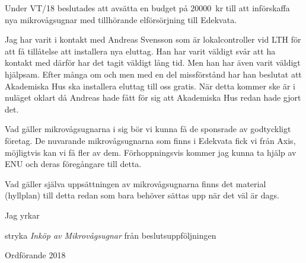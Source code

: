\documentclass[../_main/handlingar.tex]{subfiles}
\begin{document}
Under VT/18 beslutades att avsätta en budget på \SI{20 000}{kr} till att införskaffa nya mikrovågsugnar med tillhörande elförsörjning till Edekvata.

Jag har varit i kontakt med Andreas Svensson som är lokalcontroller vid LTH för att få tillåtelse att installera nya eluttag. Han har varit väldigt svår att ha kontakt med därför har det tagit väldigt lång tid. Men han har även varit väldigt hjälpsam. Efter många om och men med en del missförstånd har han beslutat att Akademiska Hus ska installera eluttag till oss gratis. När detta kommer ske är i nuläget oklart då Andreas hade fått för sig att Akademiska Hus redan hade gjort det.

Vad gäller mikrovågsugnarna i sig bör vi kunna få de sponsrade av godtyckligt företag. De nuvarande mikrovågsugnarna som finns i Edekvata fick vi från Axis, möjligtvis kan vi få fler av dem. Förhoppningsvis kommer jag kunna ta hjälp av ENU och deras föregångare till detta.

Vad gäller själva uppsättningen av mikrovågsugnarna finns det material (hyllplan) till detta redan som bara behöver sättas upp när det väl är dags.

Jag yrkar

\begin{attsatser}
    \att stryka \textit{Inköp av Mikrovågsugnar} från beslutsuppföljningen
\end{attsatser}

\begin{signatures}{1}
    \mvh
    \signature{Daniel Bakic}{Ordförande 2018}
\end{signatures}
\end{document}
